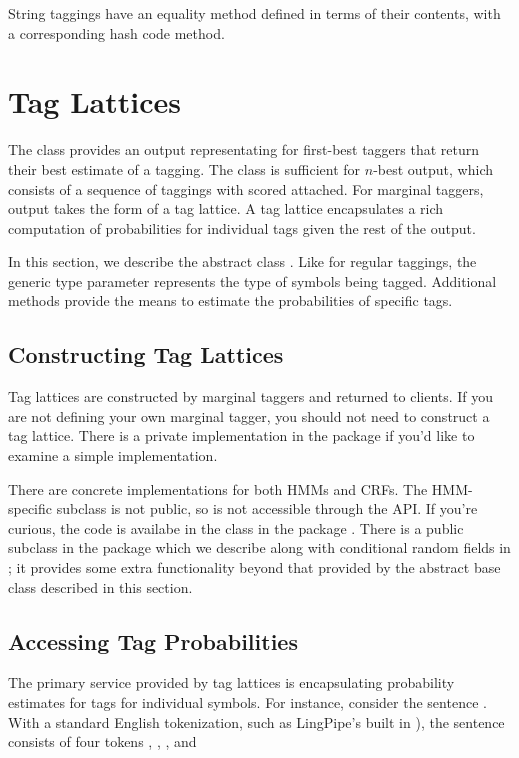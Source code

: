 String taggings have an equality method defined in terms of their
contents, with a corresponding hash code method.


\section{Tag Lattices}

The  class provides an output representating for
first-best taggers that return their best estimate of a tagging.  The
 class is sufficient for $n$-best output, which
consists of a sequence of taggings with scored attached.  For marginal
taggers, output takes the form of a tag lattice.  A tag lattice
encapsulates a rich computation of probabilities for individual
tags given the rest of the output.

In this section, we describe the abstract class .
Like for regular taggings, the generic type parameter 
represents the type of symbols being tagged.  Additional methods
provide the means to estimate the probabilities of specific tags.

\subsection{Constructing Tag Lattices}

Tag lattices are constructed by marginal taggers and returned to
clients.  If you are not defining your own marginal tagger, you should
not need to construct a tag lattice.  There is a private
implementation in the  package if you'd like to examine a
simple implementation.  

There are concrete implementations for both HMMs and CRFs.  The
HMM-specific subclass is not public, so is not accessible through the
API.  If you're curious, the code is availabe in the class
 in the package .  There is
a public subclass  in the 
package which we describe along with conditional random fields in
; it provides some extra functionality beyond that provided
by the abstract base class described in this section.

\subsection{Accessing Tag Probabilities}

The primary service provided by tag lattices is encapsulating
probability estimates for tags for individual symbols.  For instance,
consider the sentence .  With a
standard English tokenization, such as LingPipe's built in
), the sentence consists of four
tokens , ,
, and   

